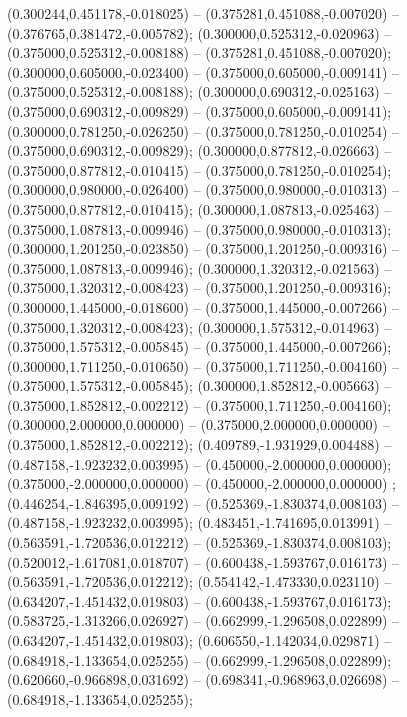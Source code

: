  (0.300244,0.451178,-0.018025) -- (0.375281,0.451088,-0.007020) -- (0.376765,0.381472,-0.005782);
 (0.300000,0.525312,-0.020963) -- (0.375000,0.525312,-0.008188) -- (0.375281,0.451088,-0.007020);
 (0.300000,0.605000,-0.023400) -- (0.375000,0.605000,-0.009141) -- (0.375000,0.525312,-0.008188);
 (0.300000,0.690312,-0.025163) -- (0.375000,0.690312,-0.009829) -- (0.375000,0.605000,-0.009141);
 (0.300000,0.781250,-0.026250) -- (0.375000,0.781250,-0.010254) -- (0.375000,0.690312,-0.009829);
 (0.300000,0.877812,-0.026663) -- (0.375000,0.877812,-0.010415) -- (0.375000,0.781250,-0.010254);
 (0.300000,0.980000,-0.026400) -- (0.375000,0.980000,-0.010313) -- (0.375000,0.877812,-0.010415);
 (0.300000,1.087813,-0.025463) -- (0.375000,1.087813,-0.009946) -- (0.375000,0.980000,-0.010313);
 (0.300000,1.201250,-0.023850) -- (0.375000,1.201250,-0.009316) -- (0.375000,1.087813,-0.009946);
 (0.300000,1.320312,-0.021563) -- (0.375000,1.320312,-0.008423) -- (0.375000,1.201250,-0.009316);
 (0.300000,1.445000,-0.018600) -- (0.375000,1.445000,-0.007266) -- (0.375000,1.320312,-0.008423);
 (0.300000,1.575312,-0.014963) -- (0.375000,1.575312,-0.005845) -- (0.375000,1.445000,-0.007266);
 (0.300000,1.711250,-0.010650) -- (0.375000,1.711250,-0.004160) -- (0.375000,1.575312,-0.005845);
 (0.300000,1.852812,-0.005663) -- (0.375000,1.852812,-0.002212) -- (0.375000,1.711250,-0.004160);
 (0.300000,2.000000,0.000000) -- (0.375000,2.000000,0.000000) -- (0.375000,1.852812,-0.002212);
 (0.409789,-1.931929,0.004488) -- (0.487158,-1.923232,0.003995) -- (0.450000,-2.000000,0.000000);
 (0.375000,-2.000000,0.000000) -- (0.450000,-2.000000,0.000000) ;
 (0.446254,-1.846395,0.009192) -- (0.525369,-1.830374,0.008103) -- (0.487158,-1.923232,0.003995);
 (0.483451,-1.741695,0.013991) -- (0.563591,-1.720536,0.012212) -- (0.525369,-1.830374,0.008103);
 (0.520012,-1.617081,0.018707) -- (0.600438,-1.593767,0.016173) -- (0.563591,-1.720536,0.012212);
 (0.554142,-1.473330,0.023110) -- (0.634207,-1.451432,0.019803) -- (0.600438,-1.593767,0.016173);
 (0.583725,-1.313266,0.026927) -- (0.662999,-1.296508,0.022899) -- (0.634207,-1.451432,0.019803);
 (0.606550,-1.142034,0.029871) -- (0.684918,-1.133654,0.025255) -- (0.662999,-1.296508,0.022899);
 (0.620660,-0.966898,0.031692) -- (0.698341,-0.968963,0.026698) -- (0.684918,-1.133654,0.025255);
